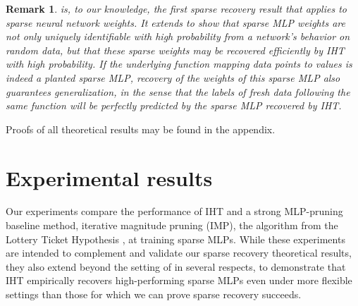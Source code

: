 \documentclass{article} %
\newtheorem{remark}{Remark}
\newcommand{\1}{\ensuremath{{\sf (i)}}}
\newcommand{\2}{\ensuremath{{\sf (ii)}}}
\newcommand{\3}{\ensuremath{{\sf (iii)}}}
\newcommand{\4}{\ensuremath{{\sf (iv)}}}
\newcommand{\5}{\ensuremath{{\sf (v)}}}
\newcommand{\6}{\ensuremath{{\sf (vi)}}}
\begin{document}
\begin{remark}
     is, to our knowledge, the first sparse recovery result that applies to sparse neural network weights. It extends  to show that sparse MLP weights are not only uniquely identifiable with high probability from a network's behavior on random data, but that these sparse weights may be recovered efficiently by IHT with high probability. 
    If the underlying function mapping data points to values is indeed a planted sparse MLP, recovery of the weights of this sparse MLP also guarantees generalization, in the sense that the labels of fresh data following the same function will be perfectly predicted by the sparse MLP recovered by IHT.
\end{remark}
Proofs of all theoretical results may be found in the appendix.

\section{Experimental results}
\label{sec:experiments}


\newcommand{\plotnotitle}[1]{%
\adjincludegraphics[trim={{0.2\width} {0.0\height} {0.05\width} {0.0\height}}, clip, width=\linewidth]{#1}%
}

\newcommand{\plotwidenotitle}[1]{%
\adjincludegraphics[trim={{0.14\width} {0.0\height} {0.05\width} {0.0\height}}, clip, width=\linewidth]{#1}%
}

Our experiments compare the performance of IHT and a strong MLP-pruning baseline method, iterative magnitude pruning (IMP), the algorithm from the Lottery Ticket Hypothesis \citep{frankle2018lottery}, at training sparse MLPs. 
While these experiments are intended to complement and validate our sparse recovery theoretical results, they also extend beyond the setting of  in several respects, to demonstrate that IHT empirically recovers high-performing sparse MLPs even under more flexible settings than those for which we can prove sparse recovery succeeds. 
\end{document}
